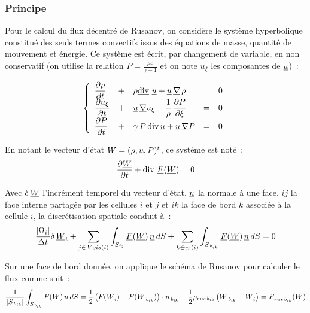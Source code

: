 \subsubsection*{Principe}

Pour le calcul du flux décentré de Rusanov, on considère
le système hyperbolique
constitué des seuls termes convectifs issus
des équations de masse, quantité de mouvement et énergie. Ce
système est écrit, par changement de variable, en non conservatif
(on utilise la relation
$\displaystyle P=\frac{\rho\varepsilon}{\gamma-1}$ et
on note $u_\xi$ les composantes de $\underline{u}$)~:

\begin{equation}
\left\{\begin{array}{lllll}
\displaystyle\frac{\partial\rho}{\partial t}
&+&\rho\underline{\text{div}}\,{\,\underline{u}} + \underline{u}\,\underline{\nabla}{\,\rho}&=& 0 \\
\displaystyle\frac{\partial u_\xi}{\partial t}
&+& \underline{u}\,\underline{\nabla}{u_\xi}+\displaystyle\frac{1}{\rho}\,\frac{\partial
P}{\partial \xi} &=& 0 \\
\displaystyle\frac{\partial P}{\partial t}
&+&\gamma\,P\,\text{div}\,{\underline{u}}+\underline{u}\,\underline{\nabla}{P}&=& 0
\end{array}\right.
\end{equation}

En notant le vecteur d'état $\underline{W}= (\rho,\underline{u},P)^t$,
ce système est noté~:
\begin{equation}
\displaystyle\frac{\partial \underline{W}}{\partial t} +\text{div}\,{\,\underline{F}(\underline{W})} = 0
\end{equation}

Avec $\delta\,\underline{W}$ l'incrément temporel du vecteur d'état, $\underline{n}$ la
normale à une face, $ij$ la face interne partagée par les cellules $i$ et
$j$ et $ik$ la face de bord $k$ associée à la cellule $i$,
la discrétisation spatiale conduit à~:
\begin{equation}
\displaystyle\frac{|\Omega_i|}{\Delta t}\delta\,\underline{W}_i
+\sum\limits_{j\in\,Vois(i)}\int_{S_{ij}} \underline{F}(\underline{W})\,\underline{n}\,dS
+\sum\limits_{k\in {\gamma_b(i)}}\int_{S_{\,{b}_{ik}}} \underline{F}(\underline{W})\,\underline{n}\,dS
=0
\end{equation}

Sur une face de bord donnée,
on applique le schéma de Rusanov pour calculer le flux
comme suit~:
\begin{equation}
\frac{1}{|S_{\,{b}_{ik}}|}\int_{S_{\,{b}_{ik}}} \underline{F}(\underline{W})\,\underline{n}\,dS
=\frac{1}{2}\left(\underline{F}(\underline{W}_i)+\underline{F}(\underline{W}_{\,{b}_{ik}})\right)\cdot\underline{n}_{\,{b}_{ik}}
-\frac{1}{2}\rho_{rus\,{b}_{ik}}\left(\underline{W}_{\,{b}_{ik}}-\underline{W}_i\right)=\underline{F}_{rus\,{b}_{ik}}(\underline{W})
\end{equation}

